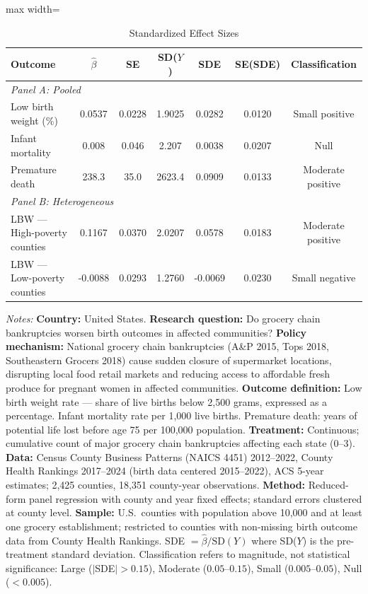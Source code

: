 \begin{table}[htbp]
\centering
\caption{Standardized Effect Sizes}
\label{tab:sde}
\begin{adjustbox}{max width=\textwidth}
\begin{tabular}{lcccccc}
\toprule
Outcome & $\hat{\beta}$ & SE & SD($Y$) & SDE & SE(SDE) & Classification \\
\midrule
\multicolumn{7}{l}{\textit{Panel A: Pooled}} \\
Low birth weight (\%) & 0.0537 & 0.0228 & 1.9025 & 0.0282 & 0.0120 & Small positive \\
Infant mortality & 0.008 & 0.046 & 2.207 & 0.0038 & 0.0207 & Null \\
Premature death & 238.3 & 35.0 & 2623.4 & 0.0909 & 0.0133 & Moderate positive \\
\midrule
\multicolumn{7}{l}{\textit{Panel B: Heterogeneous}} \\
LBW --- High-poverty counties & 0.1167 & 0.0370 & 2.0207 & 0.0578 & 0.0183 & Moderate positive \\
LBW --- Low-poverty counties & -0.0088 & 0.0293 & 1.2760 & -0.0069 & 0.0230 & Small negative \\
\bottomrule
\end{tabular}
\end{adjustbox}
\par\vspace{0.3em}
{\small \textit{Notes:} \textbf{Country:} United States. \textbf{Research question:} Do grocery chain bankruptcies worsen birth outcomes in affected communities? \textbf{Policy mechanism:} National grocery chain bankruptcies (A\&P 2015, Tops 2018, Southeastern Grocers 2018) cause sudden closure of supermarket locations, disrupting local food retail markets and reducing access to affordable fresh produce for pregnant women in affected communities. \textbf{Outcome definition:} Low birth weight rate --- share of live births below 2,500 grams, expressed as a percentage. Infant mortality rate per 1,000 live births. Premature death: years of potential life lost before age 75 per 100,000 population. \textbf{Treatment:} Continuous; cumulative count of major grocery chain bankruptcies affecting each state (0--3). \textbf{Data:} Census County Business Patterns (NAICS 4451) 2012--2022, County Health Rankings 2017--2024 (birth data centered 2015--2022), ACS 5-year estimates; 2,425 counties, 18,351 county-year observations. \textbf{Method:} Reduced-form panel regression with county and year fixed effects; standard errors clustered at county level. \textbf{Sample:} U.S.\ counties with population above 10,000 and at least one grocery establishment; restricted to counties with non-missing birth outcome data from County Health Rankings. SDE $= \hat{\beta} / \text{SD}(Y)$ where SD($Y$) is the pre-treatment standard deviation. Classification refers to magnitude, not statistical significance: Large ($|$SDE$| > 0.15$), Moderate ($0.05$--$0.15$), Small ($0.005$--$0.05$), Null ($< 0.005$).}
\end{table}
